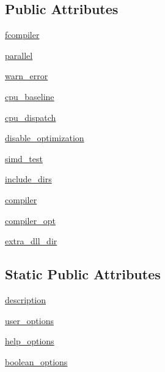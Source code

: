 \subsection*{Public Attributes}
\begin{DoxyCompactItemize}
\item 
\hyperlink{classnumpy_1_1distutils_1_1command_1_1build__ext_1_1build__ext_a2e085b4918a1e8f9505e87836ad97b68}{fcompiler}
\item 
\hyperlink{classnumpy_1_1distutils_1_1command_1_1build__ext_1_1build__ext_a2824b0f60843445c02a63caa3b7bbacb}{parallel}
\item 
\hyperlink{classnumpy_1_1distutils_1_1command_1_1build__ext_1_1build__ext_a72a6af2542763bca0380a1168c161969}{warn\+\_\+error}
\item 
\hyperlink{classnumpy_1_1distutils_1_1command_1_1build__ext_1_1build__ext_a631e17b5fb89b36516bb2648feef6f01}{cpu\+\_\+baseline}
\item 
\hyperlink{classnumpy_1_1distutils_1_1command_1_1build__ext_1_1build__ext_abe9d16f9653860d94b8e0b65a43a498e}{cpu\+\_\+dispatch}
\item 
\hyperlink{classnumpy_1_1distutils_1_1command_1_1build__ext_1_1build__ext_ae44159c8a395d9844556199fb16eea73}{disable\+\_\+optimization}
\item 
\hyperlink{classnumpy_1_1distutils_1_1command_1_1build__ext_1_1build__ext_a51fd8363af8eb74bcaf079c85aeea55c}{simd\+\_\+test}
\item 
\hyperlink{classnumpy_1_1distutils_1_1command_1_1build__ext_1_1build__ext_ae176a3e68e15c3da802145d621881f88}{include\+\_\+dirs}
\item 
\hyperlink{classnumpy_1_1distutils_1_1command_1_1build__ext_1_1build__ext_a9e1a7841beab530e18cbff8abe1e14a0}{compiler}
\item 
\hyperlink{classnumpy_1_1distutils_1_1command_1_1build__ext_1_1build__ext_ab91a00e2e0f15d9951a640e75db4cc46}{compiler\+\_\+opt}
\item 
\hyperlink{classnumpy_1_1distutils_1_1command_1_1build__ext_1_1build__ext_a8ad23a45ec6031d894acedc1374d9b57}{extra\+\_\+dll\+\_\+dir}
\end{DoxyCompactItemize}
\subsection*{Static Public Attributes}
\begin{DoxyCompactItemize}
\item 
\hyperlink{classnumpy_1_1distutils_1_1command_1_1build__ext_1_1build__ext_af306fc36c54b9c632e65703a2005d181}{description}
\item 
\hyperlink{classnumpy_1_1distutils_1_1command_1_1build__ext_1_1build__ext_a34194962f88a5c4de772b40bc8bedea2}{user\+\_\+options}
\item 
\hyperlink{classnumpy_1_1distutils_1_1command_1_1build__ext_1_1build__ext_a2d46d511f6278a4d08780f1f13fa7e6c}{help\+\_\+options}
\item 
\hyperlink{classnumpy_1_1distutils_1_1command_1_1build__ext_1_1build__ext_a04c948a4da6b286c5cc3ba30fbe35713}{boolean\+\_\+options}
\end{DoxyCompactItemize}


